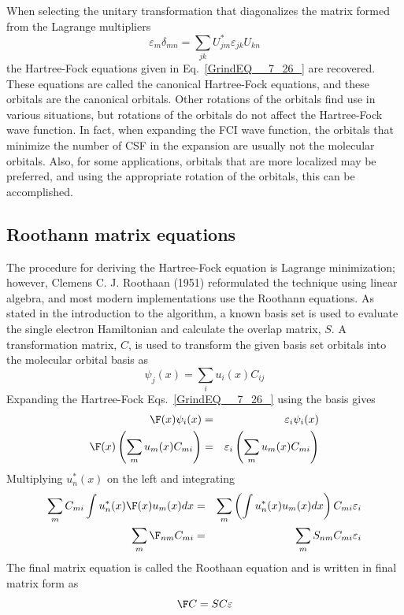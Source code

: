 \documentclass[11pt,oneside,final]{huthesis}%
\begin{document}
When selecting the unitary transformation that diagonalizes the matrix formed from the Lagrange multipliers
\begin{equation} \label{GrindEQ__7_31_} 
\varepsilon_{m} \delta _{mn} =\sum _{jk}U_{jm}^{*} \varepsilon_{jk} U_{kn}   
\end{equation} 
the Hartree-Fock equations given in Eq.~\eqref{GrindEQ__7_26_} are recovered.  These equations are called the canonical Hartree-Fock equations, and these orbitals are the canonical orbitals.  Other rotations of the orbitals find use in various situations, but {rotations of the orbitals do not affect the Hartree-Fock wave function}. In fact, when expanding the FCI wave function, the orbitals that minimize the number of CSF in the expansion are usually not the molecular orbitals.  Also, for some applications, orbitals that are more localized may be preferred, and using the appropriate rotation of the orbitals, this can be accomplished.


\subsection{Roothann matrix equations}

The procedure for deriving the Hartree-Fock equation is Lagrange minimization; however, Clemens C. J. Roothaan (1951)  reformulated the technique using linear algebra, and most modern implementations use the Roothann equations.   As stated in the introduction to the algorithm, a known basis set is used to evaluate the single electron Hamiltonian and calculate the overlap matrix, $S.$   A transformation matrix, $C$, is used to transform the given basis set orbitals into the molecular orbital basis as
\begin{equation} \label{GrindEQ__7_30_1} 
\psi _{j} (x)=\sum _{i}u_{i} (x)C_{ij}   
\end{equation} 
Expanding the Hartree-Fock Eqs.~\eqref{GrindEQ__7_26_} using the basis gives
\begin{eqnarray*} %
\F(x)\psi _{i} (x) &=& \varepsilon_{i} \psi_{i}(x) \\ 
\F(x)\left(\sum _{m}u_{m} (x)C_{mi}  \right)&=& \varepsilon_{i} \left(\sum_{m}u_{m} (x)C_{mi}  \right)
\end{eqnarray*} 
Multiplying $u_{n}^{*} (x)$ on the left and integrating
\begin{eqnarray*} %
\sum _{m}C_{mi}  \int u_{n}^{*} (x)\F(x)u_{m} (x)dx &=& \sum_{m}\left(\int u_{n}^{*} (x)u_{m} (x) dx\right)C_{mi}  \varepsilon _{i}  \\ 
\sum _{m}\F_{nm} C_{mi}  &=&\sum _{m}S_{nm} C_{mi} \varepsilon _{i}  
\end{eqnarray*} 
The final matrix equation is called the Roothaan equation and is written in final matrix form as
\begin{equation} \label{GrindEQ__7_33_} 
\F C= SC\varepsilon  
\end{equation} 
\end{document}
